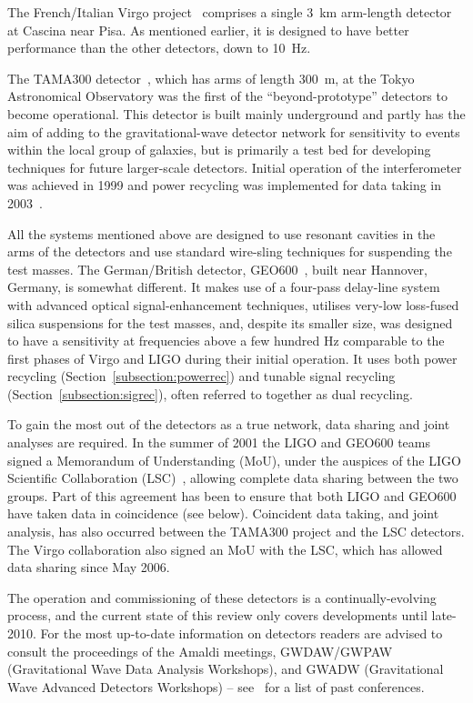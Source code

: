 The French/Italian Virgo project~\cite{VIRGOweb} comprises a single
3~km arm-length detector at Cascina near Pisa. As mentioned earlier,
it is designed to have better performance than the other detectors,
down to 10~Hz.


The TAMA300 detector~\cite{TAMAweb}, which has arms of length 300~m, at the
Tokyo Astronomical Observatory was the first of the ``beyond-prototype''
detectors to become operational. This detector is built mainly underground and
partly has the aim of adding to the gravitational-wave detector network for
sensitivity to events within the local group of galaxies, but is primarily a
test bed for developing techniques for future larger-scale detectors. Initial
operation of the interferometer was achieved in 1999 and power recycling was
implemented for data taking in 2003~\cite{Arai:2003}.


All the systems mentioned above are designed to use resonant cavities in the
arms of the detectors and use standard wire-sling techniques for suspending the
test masses. The German/British detector, GEO600~\cite{GEOweb}, built near
Hannover, Germany, is somewhat different. It makes use of a four-pass delay-line
system with advanced optical signal-enhancement techniques, utilises very-low
loss-fused silica suspensions for the test masses, and, despite its smaller size,
was designed to have a sensitivity at frequencies above a few hundred Hz
comparable to the first phases of Virgo and LIGO during their initial operation.
It uses both power recycling (Section~\ref{subsection:powerrec}) and tunable signal
recycling (Section~\ref{subsection:sigrec}), often referred to together as dual
recycling.


To gain the most out of the detectors as a true network, data sharing and joint
analyses are required. In the summer of 2001 the LIGO and GEO600 teams signed a
Memorandum of Understanding (MoU), under the auspices of the LIGO Scientific
Collaboration (LSC)~\cite{LSCweb}, allowing complete data sharing between the
two groups. Part of this agreement has been to ensure that both LIGO and
GEO600 have taken data in coincidence (see below). Coincident data taking, and
joint analysis, has also occurred between the TAMA300 project and the LSC
detectors. The Virgo collaboration also signed an MoU with the LSC, which has
allowed data sharing since May 2006.


The operation and commissioning of these detectors is a continually-evolving
process, and the current state of this review only covers developments until
late-2010. For the most up-to-date information on detectors readers are advised
to consult the proceedings of the Amaldi meetings, GWDAW/GWPAW (Gravitational
Wave Data Analysis Workshops), and GWADW (Gravitational Wave Advanced Detectors
Workshops) -- see~\cite{confs} for a list of past conferences.


